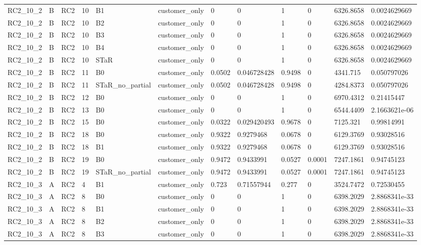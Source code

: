 \begin{longtable}{llllllllllll}
RC2\_10\_2 & B & RC2 & 10 & B1 & customer\_only & 0 & 0 & 1 & 0 & 6326.8658 & 0.0024629669 \\
RC2\_10\_2 & B & RC2 & 10 & B2 & customer\_only & 0 & 0 & 1 & 0 & 6326.8658 & 0.0024629669 \\
RC2\_10\_2 & B & RC2 & 10 & B3 & customer\_only & 0 & 0 & 1 & 0 & 6326.8658 & 0.0024629669 \\
RC2\_10\_2 & B & RC2 & 10 & B4 & customer\_only & 0 & 0 & 1 & 0 & 6326.8658 & 0.0024629669 \\
RC2\_10\_2 & B & RC2 & 10 & STaR & customer\_only & 0 & 0 & 1 & 0 & 6326.8658 & 0.0024629669 \\
RC2\_10\_2 & B & RC2 & 11 & B0 & customer\_only & 0.0502 & 0.046728428 & 0.9498 & 0 & 4341.715 & 0.050797026 \\
RC2\_10\_2 & B & RC2 & 11 & STaR\_no\_partial & customer\_only & 0.0502 & 0.046728428 & 0.9498 & 0 & 4284.8373 & 0.050797026 \\
RC2\_10\_2 & B & RC2 & 12 & B0 & customer\_only & 0 & 0 & 1 & 0 & 6970.4312 & 0.21415447 \\
RC2\_10\_2 & B & RC2 & 13 & B0 & customer\_only & 0 & 0 & 1 & 0 & 6544.4409 & 2.1663621e-06 \\
RC2\_10\_2 & B & RC2 & 15 & B0 & customer\_only & 0.0322 & 0.029420493 & 0.9678 & 0 & 7125.321 & 0.99814991 \\
RC2\_10\_2 & B & RC2 & 18 & B0 & customer\_only & 0.9322 & 0.9279468 & 0.0678 & 0 & 6129.3769 & 0.93028516 \\
RC2\_10\_2 & B & RC2 & 18 & B1 & customer\_only & 0.9322 & 0.9279468 & 0.0678 & 0 & 6129.3769 & 0.93028516 \\
RC2\_10\_2 & B & RC2 & 19 & B0 & customer\_only & 0.9472 & 0.9433991 & 0.0527 & 0.0001 & 7247.1861 & 0.94745123 \\
RC2\_10\_2 & B & RC2 & 19 & STaR\_no\_partial & customer\_only & 0.9472 & 0.9433991 & 0.0527 & 0.0001 & 7247.1861 & 0.94745123 \\
RC2\_10\_3 & A & RC2 & 4 & B1 & customer\_only & 0.723 & 0.71557944 & 0.277 & 0 & 3524.7472 & 0.72530455 \\
RC2\_10\_3 & A & RC2 & 8 & B0 & customer\_only & 0 & 0 & 1 & 0 & 6398.2029 & 2.8868341e-33 \\
RC2\_10\_3 & A & RC2 & 8 & B1 & customer\_only & 0 & 0 & 1 & 0 & 6398.2029 & 2.8868341e-33 \\
RC2\_10\_3 & A & RC2 & 8 & B2 & customer\_only & 0 & 0 & 1 & 0 & 6398.2029 & 2.8868341e-33 \\
RC2\_10\_3 & A & RC2 & 8 & B3 & customer\_only & 0 & 0 & 1 & 0 & 6398.2029 & 2.8868341e-33 \\

\end{longtable}
